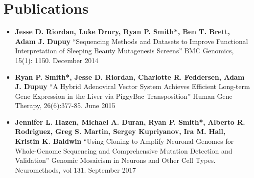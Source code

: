 \documentclass[letterpaper,hidelinks,11pt]{article}
\newcommand{\publicationItem}[2]{
	\item\small{
		\textbf{#1}{#2 \vspace{-2pt}}
	}
}
\newcommand{\resumeSubHeadingListStart}{\begin{itemize}[leftmargin=*]}
\newcommand{\resumeSubHeadingListEnd}{\end{itemize}}
\begin{document}
\section{Publications}
  \resumeSubHeadingListStart
  
  	\publicationItem{Jesse D. Riordan, Luke Drury, Ryan P. Smith*, Ben T. Brett, Adam J. Dupuy}
  	{ ``Sequencing Methods and Datasets to Improve Functional Interpretation of Sleeping Beauty Mutagenesis Screens'' BMC Genomics, 15(1): 1150. December 2014}
  	
   	\publicationItem{Ryan P. Smith*, Jesse D. Riordan, Charlotte R. Feddersen, Adam J. Dupuy}
   	{ ``A Hybrid Adenoviral Vector System Achieves Efficient Long-term Gene Expression in the Liver via PiggyBac Transposition'' Human Gene Therapy, 26(6):377-85. June 2015}
   	
   	\publicationItem{Jennifer L. Hazen, Michael A. Duran, Ryan P. Smith*, Alberto R. Rodriguez, Greg S. Martin, Sergey Kupriyanov, Ira M. Hall, Kristin K. Baldwin}
   	{ ``Using Cloning to Amplify Neuronal Genomes for Whole-Genome Sequencing and Comprehensive Mutation Detection and Validation'' Genomic Mosaicism in Neurons and Other Cell Types. Neuromethods, vol 131. September 2017}
   	
  \resumeSubHeadingListEnd

\end{document}
